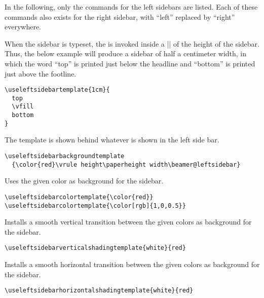 \label{section-sidebar-templates}

In the following, only the commands for the left sidebars are
listed. Each of these commands also exists for the right sidebar,
with ``left'' replaced by ``right'' everywhere.


\begin{command}{\useleftsidebartemplate{}}
  When the sidebar is typeset, the  is invoked inside a
  |\vbox| of the height of the sidebar. Thus, the below example
  will produce a sidebar of half a centimeter width, in which the word
  ``top'' is printed just below the headline and ``bottom'' is printed
  just above the footline.
  \example
\begin{verbatim}
\useleftsidebartemplate{1cm}{
  top
  \vfill
  bottom
}
\end{verbatim}
\end{command}

\begin{command}{\useleftsidebarbackgroundtemplate{}}
  The template is shown behind whatever is shown in the left side
  bar. 
  \example
\begin{verbatim}
\useleftsidebarbackgroundtemplate
  {\color{red}\vrule height\paperheight width\beamer@leftsidebar}
\end{verbatim}
\end{command}


\begin{command}{\useleftsidebarcolortemplate{}}
  Uses the given color as background for the sidebar.
  \example
\begin{verbatim}
\useleftsidebarcolortemplate{\color{red}}
\useleftsidebarcolortemplate{\color[rgb]{1,0,0.5}}
\end{verbatim}
\end{command}

\begin{command}{\useleftsidebarverticalshadingtemplate{}}
  Installs a smooth vertical transition between the given colors as
  background for the sidebar.
  \example
\begin{verbatim}
\useleftsidebarverticalshadingtemplate{white}{red}
\end{verbatim}
\end{command}


\begin{command}{\useleftsidebarhorizontalshadingtemplate{}}
  Installs a smooth horizontal transition between the given colors as
  background for the sidebar.
  \example
\begin{verbatim}
\useleftsidebarhorizontalshadingtemplate{white}{red}
\end{verbatim}
\end{command}


